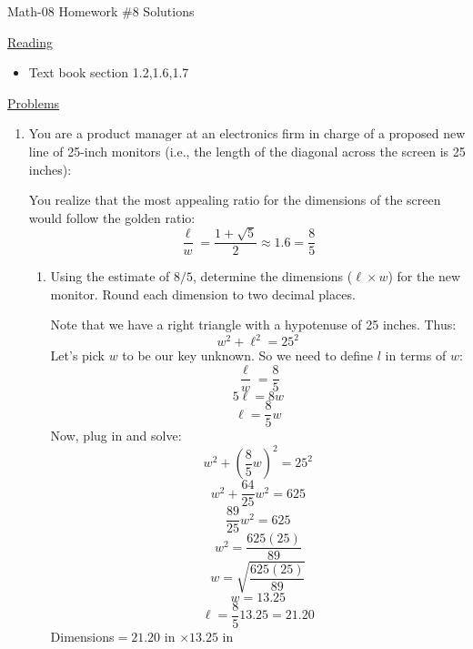 \documentclass[letterpaper,12pt,fleqn]{article}
\begin{document}
\begin{center}
\Large Math-08 Homework \#8 Solutions
\end{center}

\vspace{0.5in}

\underline{Reading}

\begin{itemize}
\item Text book section 1.2,1.6,1.7
\end{itemize}

\underline{Problems}

\begin{enumerate}

\item You are a product manager at an electronics firm in charge of a proposed
  new line of 25-inch monitors (i.e., the length of the diagonal across the
  screen is 25 inches):

  \bigskip

  \begin{figure}[h]
    \setlength{\leftskip}{1in}
  \end{figure}

  You realize that the most appealing ratio for the dimensions of the screen
  would follow the golden ratio:
  \[\frac{\ell}{w}=\frac{1+\sqrt{5}}{2}\approx1.6=\frac{8}{5}\]

  \begin{enumerate}
  \item Using the estimate of $8/5$, determine the dimensions ($\ell\times w$)
    for the new monitor. Round each dimension to two decimal places.

    \bigskip

    Note that we have a right triangle with a hypotenuse of 25 inches. Thus:
    \[w^2+\ell^2=25^2\]
    Let's pick $w$ to be our key unknown. So we need to define $l$ in terms of
    $w$:
    \[\frac{\ell}{w}=\frac{8}{5}\]
    \[5\ell=8w\]
    \[\ell=\frac{8}{5}w\]
    Now, plug in and solve:
    \[w^2+\left(\frac{8}{5}w\right)^2=25^2\]
    \[w^2+\frac{64}{25}w^2=625\]
    \[\frac{89}{25}w^2=625\]
    \[w^2=\frac{625(25)}{89}\]
    \[w=\sqrt{\frac{625(25)}{89}}\]
    \[w=13.25\]
    \[\ell=\frac{8}{5}13.25=21.20\]
    Dimensions$=21.20$ in $\times13.25$ in


\end{enumerate}
\end{enumerate}
\end{document}
